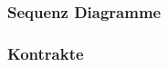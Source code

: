 \documentclass[./detailed_overview_usecases.tex]{subfiles}
\begin{document}
    \subsubsection{Sequenz Diagramme}
    \subsubsection{Kontrakte}
\end{document}
